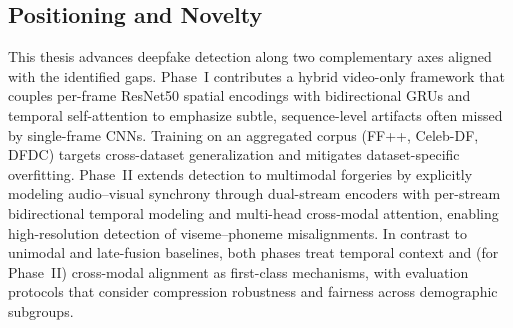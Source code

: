 \subsection*{Positioning and Novelty}
This thesis advances deepfake detection along two complementary axes aligned with the identified gaps. Phase~I contributes a hybrid video-only framework that couples per-frame ResNet50 spatial encodings with bidirectional GRUs and temporal self-attention to emphasize subtle, sequence-level artifacts often missed by single-frame CNNs. Training on an aggregated corpus (FF++, Celeb-DF, DFDC) targets cross-dataset generalization and mitigates dataset-specific overfitting. Phase~II extends detection to multimodal forgeries by explicitly modeling audio--visual synchrony through dual-stream encoders with per-stream bidirectional temporal modeling and multi-head cross-modal attention, enabling high-resolution detection of viseme--phoneme misalignments. In contrast to unimodal and late-fusion baselines, both phases treat temporal context and (for Phase~II) cross-modal alignment as first-class mechanisms, with evaluation protocols that consider compression robustness and fairness across demographic subgroups.

\label{ch:literature}
